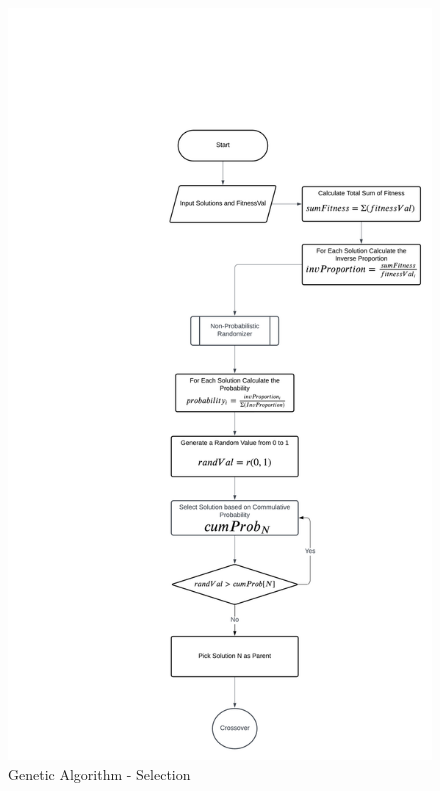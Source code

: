 \begin{appendices}
\begin{centerappendixtitle}
\begin{figure}[h]
		\end{figure}
		
		\begin{figure}[h]
			\centering
			\caption{Genetic Algorithm - Selection}
			\label{selectFlow}
			\includegraphics[width=\linewidth]{appendix/select f}
		\end{figure}
		

\end{centerappendixtitle}
\end{appendices}
